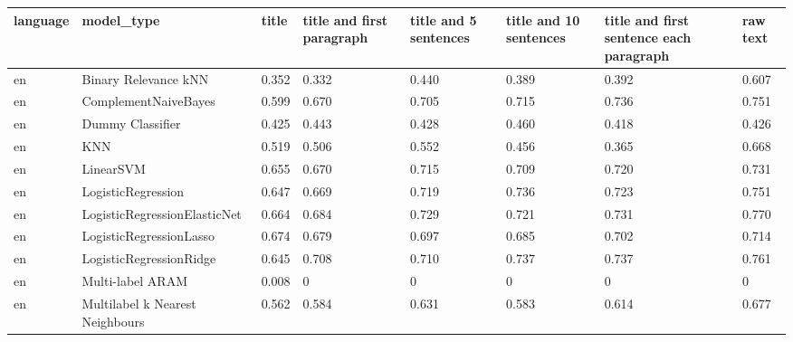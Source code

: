 \begin{tabular}{llllllll}
\toprule
language &                      model\_type & title & title and first paragraph & title and 5 sentences & title and 10 sentences & title and first sentence each paragraph &  raw text \\
\midrule
      en &            Binary Relevance kNN & 0.352 &                     0.332 &                 0.440 &                  0.389 &                                   0.392 &     0.607 \\
      en &            ComplementNaiveBayes & 0.599 &                     0.670 &                 0.705 &                  0.715 &                                   0.736 &     0.751 \\
      en &                Dummy Classifier & 0.425 &                     0.443 &                 0.428 &                  0.460 &                                   0.418 &     0.426 \\
      en &                             KNN & 0.519 &                     0.506 &                 0.552 &                  0.456 &                                   0.365 &     0.668 \\
      en &                       LinearSVM & 0.655 &                     0.670 &                 0.715 &                  0.709 &                                   0.720 &     0.731 \\
      en &              LogisticRegression & 0.647 &                     0.669 &                 0.719 &                  0.736 &                                   0.723 &     0.751 \\
      en &    LogisticRegressionElasticNet & 0.664 &                     0.684 &                 0.729 &                  0.721 &                                   0.731 &     0.770 \\
      en &         LogisticRegressionLasso & 0.674 &                     0.679 &                 0.697 &                  0.685 &                                   0.702 &     0.714 \\
      en &         LogisticRegressionRidge & 0.645 &                     0.708 &                 0.710 &                  0.737 &                                   0.737 &     0.761 \\
      en &                Multi-label ARAM & 0.008 &                         0 &                     0 &                      0 &                                       0 &         0 \\
      en & Multilabel k Nearest Neighbours & 0.562 &                     0.584 &                 0.631 &                  0.583 &                                   0.614 &     0.677 \\

\end{tabular}
